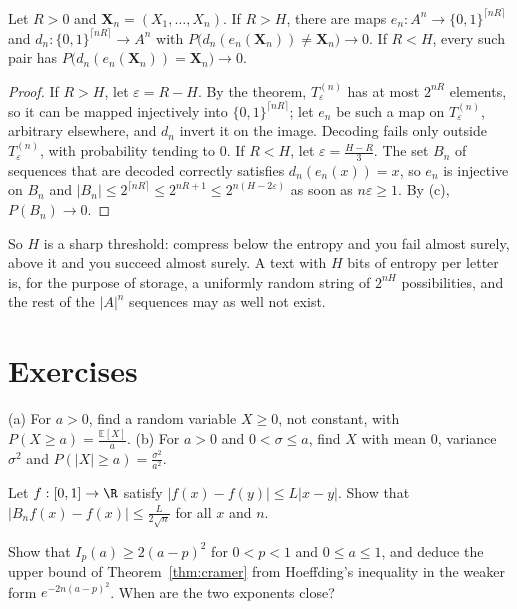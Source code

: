 \begin{corollary}\label{cor:fixedlength}
Let $R>0$ and $\mathbf X_n=(X_1,\dots,X_n)$. If $R>H$, there are maps $e_n:A^n\to\{0,1\}^{\lceil nR\rceil}$ and $d_n:\{0,1\}^{\lceil nR\rceil}\to A^n$
with $P\bigl(d_n(e_n(\mathbf X_n))\ne\mathbf X_n\bigr)\to0$. If $R<H$, every such pair has $P\bigl(d_n(e_n(\mathbf X_n))=\mathbf X_n\bigr)\to0$.
\end{corollary}
\begin{proof}
If $R>H$, let $\varepsilon=R-H$. By the theorem, $T_\varepsilon^{(n)}$ has at most $2^{nR}$ elements, so it can be mapped injectively into
$\{0,1\}^{\lceil nR\rceil}$; let $e_n$ be such a map on $T_\varepsilon^{(n)}$, arbitrary elsewhere, and $d_n$ invert it on the image. Decoding fails only
outside $T_\varepsilon^{(n)}$, with probability tending to $0$. If $R<H$, let $\varepsilon=\frac{H-R}3$. The set $B_n$ of sequences that are
decoded correctly satisfies $d_n(e_n(x))=x$, so $e_n$ is injective on $B_n$ and $|B_n|\le2^{\lceil nR\rceil}\le2^{nR+1}\le2^{n(H-2\varepsilon)}$ as soon as
$n\varepsilon\ge1$. By (c), $P(B_n)\to0$.
\end{proof}

So $H$ is a sharp threshold: compress below the entropy and you fail almost surely, above it and you succeed
almost surely. A text with $H$ bits of entropy per letter is, for the purpose of storage, a uniformly random
string of $2^{nH}$ possibilities, and the rest of the $|A|^n$ sequences may as well not exist.

\section{Exercises}

\begin{exercise}[$\star$]\label{ex:sharp}
(a) For $a>0$, find a random variable $X\ge0$, not constant, with $P(X\ge a)=\frac{\mathbb E[X]}a$. (b) For $a>0$ and $0<\sigma\le a$, find $X$ with mean
$0$, variance $\sigma^2$ and $P(|X|\ge a)=\frac{\sigma^2}{a^2}$.
\end{exercise}

\begin{exercise}[$\star$]\label{ex:lipschitz}
Let $f:[0,1]\to\R$ satisfy $|f(x)-f(y)|\le L|x-y|$. Show that $|B_nf(x)-f(x)|\le\frac L{2\sqrt n}$ for all $x$ and $n$.
\end{exercise}

\begin{exercise}[$\star\star$]\label{ex:pinsker}
Show that $I_p(a)\ge2(a-p)^2$ for $0<p<1$ and $0\le a\le1$, and deduce the upper bound of Theorem~\ref{thm:cramer} from Hoeffding's
inequality in the weaker form $e^{-2n(a-p)^2}$. When are the two exponents close?
\end{exercise}

